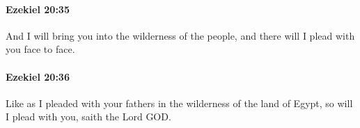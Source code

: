 		\paragraph{Ezekiel 20:35} %
			\label{EZEKIEL-20-35}

			And I will bring you into the wilderness of the people, and there will I plead with you face to face.


		\paragraph{Ezekiel 20:36} %
			\label{EZEKIEL-20-36}

			Like as I pleaded with your fathers in the wilderness of the land of Egypt, so will I plead with you, saith the Lord GOD.


